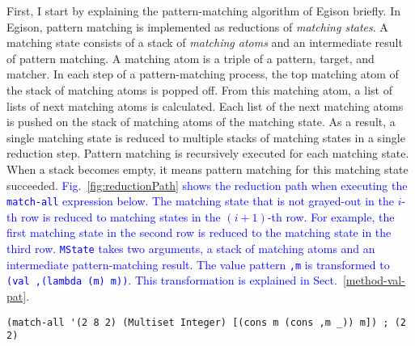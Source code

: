 \documentclass[acmlarge]{acmart}
\newcommand{\new}[1]{\textcolor{blue}{#1}}
\begin{document}
First, I start by explaining the pattern-matching algorithm of Egison briefly.
In Egison, pattern matching is implemented as reductions of \emph{matching states}.
A matching state consists of a stack of \emph{matching atoms} and an intermediate result of pattern matching.
A matching atom is a triple of a pattern, target, and matcher.
In each step of a pattern-matching process, the top matching atom of the stack of matching atoms is popped off.
From this matching atom, a list of lists of next matching atoms is calculated.
Each list of the next matching atoms is pushed on the stack of matching atoms of the matching state.
As a result, a single matching state is reduced to multiple stacks of matching states in a single reduction step.
Pattern matching is recursively executed for each matching state.
When a stack becomes empty, it means pattern matching for this matching state succeeded.
\new{
Fig.~\ref{fig:reductionPath} shows the reduction path when executing the \lstinline{match-all} expression below.
The matching state that is not grayed-out in the $i$-th row is reduced to matching states in the $(i+1)$-th row.
For example, the first matching state in the second row is reduced to the matching state in the third row.
\texttt{MState} takes two arguments, a stack of matching atoms and an intermediate pattern-matching result.
The value pattern \lstinline{,m} is transformed to \lstinline{(val ,(lambda (m) m))}.
This transformation is explained in Sect.~\ref{method-val-pat}.
}%

\begin{lstlisting}[language=egison]
(match-all '(2 8 2) (Multiset Integer) [(cons m (cons ,m _)) m]) ; (2 2)
\end{lstlisting}
\end{document}
